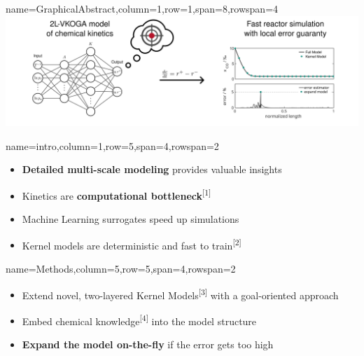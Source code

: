 \documentclass[
	accentcolor=3c,
	boxstyle=colored, %
	colorback=false,
	title=small
	]{tudasciposter}
\begin{document}
\begin{tcbposter}[
	poster={
		columns=8,
		rows=12,
		spacing=1cm,
	},]

\begin{posterboxenv}{name=GraphicalAbstract,column=1,row=1,span=8,rowspan=4}
	\centering
	\includegraphics[width=\textwidth]{abb/GA_draft}
\end{posterboxenv}

\begin{posterboxenv}[title=1. Introduction]{name=intro,column=1,row=5,span=4,rowspan=2}
	\begin{itemize}
		\item \textbf{Detailed multi-scale modeling} provides valuable insights
		\item Kinetics are \textbf{computational bottleneck}\textsuperscript{[1]}
		\item Machine Learning surrogates speed up simulations
		\item Kernel models are deterministic and fast to train\textsuperscript{[2]}
	\end{itemize}
\end{posterboxenv}

\begin{posterboxenv}[title=2. Methods]{name=Methods,column=5,row=5,span=4,rowspan=2}
	\begin{itemize}
		\item Extend novel, two-layered Kernel Models\textsuperscript{[3]} with a goal-oriented approach
		\item Embed chemical knowledge\textsuperscript{[4]} into the model structure %
		\item \textbf{Expand the model on-the-fly} if the error gets too high
	\end{itemize}
\end{posterboxenv}


\end{tcbposter}
\end{document}

